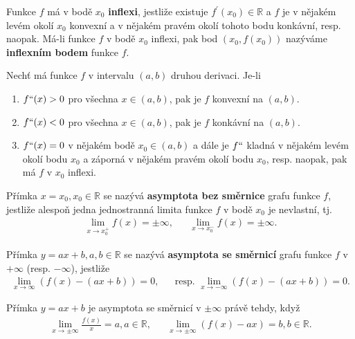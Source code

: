 \begin{definition}
Funkce $f$ má v bodě $x_0$ \textbf{inflexi}, jestliže existuje $f^\prime(x_0) \in
\mathbb R$ a $f$ je v nějakém levém okolí $x_0$ konvexní a v nějakém pravém okolí
tohoto bodu konkávní, resp. naopak. Má-li funkce $f$ v bodě $x_0$ inflexi, pak bod
$(x_0, f(x_0))$ nazýváme \textbf{inflexním bodem} funkce $f$.
\end{definition}

\begin{veta}
Nechť má funkce $f$ v intervalu $(a,b)$ druhou derivaci. Je-li
\begin{enumerate}[$i.$]
\item $f`` (x)>0$ pro všechna $x \in (a,b)$, pak je $f$
konvexní na $(a,b)$.
\item $f``(x)<0$ pro všechna $x \in (a,b)$, pak je $f$
konkávní na $(a,b)$.
\item $f``(x)=0$ v nějakém bodě $x_0\in(a,b)$ a dále je $f``$
kladná v nějakém levém okolí bodu $x_0$ a záporná v nějakém pravém okolí bodu $x_0$,
resp. naopak, pak má $f$ v $x_0$ inflexi.
\end{enumerate}
\end{veta}

\begin{definition}
Přímka $x=x_0,x_0\in \mathbb R$ se nazývá \textbf{asymptota bez směrnice}
grafu funkce $f$, jestliže alespoň jedna jednostranná limita funkce $f$
v bodě $x_0$ je nevlastní, tj.
\begin{align*}
    \lim_{x\to x_0^+} f(x) = \pm\infty, & & \lim_{x\to x_0^-} f(x)=\pm\infty.
\end{align*}
\end{definition}

\begin{definition}
Přímka $y=ax+b, a,b\in \mathbb R$ se nazývá \textbf{asymptota se směrnicí} grafu
funkce $f$ v $+\infty$ (resp. $-\infty$), jestliže
\begin{align*}
    \lim_{x\to\infty}(f(x)-(ax+b))=0, & & \textrm{resp. }\lim_{x\to-\infty}(f(x)-(ax+b))=0.
\end{align*}
\end{definition}

\begin{veta}
    Přímka $y=ax+b$ je asymptota se směrnicí v $\pm\infty$ právě tehdy, když
    \begin{align*}
        \lim_{x\to\pm\infty}\frac{f(x)}{x}=a, a\in \mathbb R, & & \lim_{x\to\pm\infty}(f(x)-ax)=b,b \in \mathbb R.
    \end{align*}
\end{veta}


